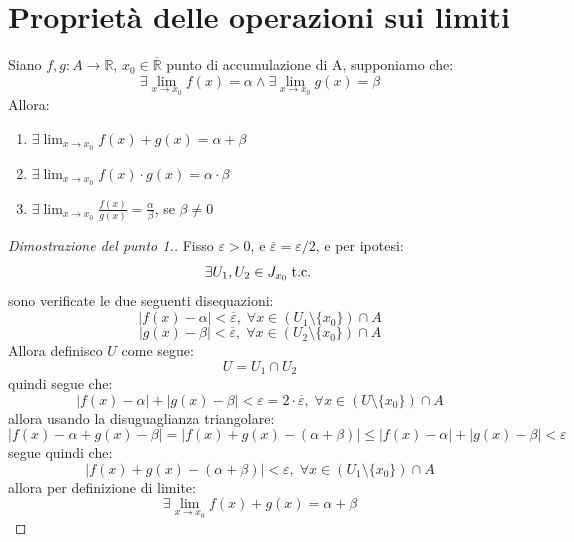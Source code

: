 \documentclass[a4paper,12pt,openright]{book}
\begin{document}
	\section{Proprietà delle operazioni sui limiti}
	Siano $f, g: A \longrightarrow \mathbb{R}$, $x_0 \in \overline{\mathbb{R}}$ punto di accumulazione di A, supponiamo che:
	\[\exists \lim_{x \rightarrow x_0} f(x) = \alpha \wedge \exists \lim_{x \rightarrow x_0} g(x) = \beta\]
	Allora:
	\begin{enumerate}
		\item $\exists \lim_{x \rightarrow x_0} f(x) + g(x) = \alpha + \beta$
		\item $\exists \lim_{x \rightarrow x_0} f(x) \cdot g(x) = \alpha \cdot \beta$
		\item $\exists \lim_{x \rightarrow x_0} \frac{f(x)}{g(x)} = \frac{\alpha}{\beta}$, se $\beta \not = 0$ 
	\end{enumerate}
	
	\begin{proof}[Dimostrazione del punto 1.]
		Fisso $\varepsilon > 0$, e $\overline{\varepsilon} = \varepsilon/2$, e per ipotesi:
		\[\exists U_1, U_2 \in J_{x_0} \;\text{t.c.}\; \]
		sono verificate le due seguenti disequazioni:
		\[|f(x) - \alpha| < \overline{\varepsilon}, \; \forall x \in (U_1 \setminus \{x_0\}) \cap A\]
		\[|g(x) - \beta| < \overline{\varepsilon}, \; \forall x \in (U_2 \setminus \{x_0\}) \cap A\]
		Allora definisco $U$ come segue:
		\[U = U_1 \cap U_2\]
		quindi segue che:
		\[|f(x) - \alpha| + |g(x) - \beta| < \varepsilon = 2 \cdot \overline{\varepsilon}, \; \forall x \in (U \setminus \{x_0\}) \cap A\]
		allora usando la disuguaglianza triangolare:
		\[|f(x) - \alpha + g(x) - \beta| = |f(x) + g(x) - (\alpha + \beta)| \leq |f(x) - \alpha| + |g(x) - \beta| < \varepsilon\]
		segue quindi che:
		\[|f(x) + g(x) - (\alpha + \beta)| < \varepsilon, \; \forall x \in (U_1 \setminus \{x_0\}) \cap A\]
		allora per definizione di limite:
		\[\exists \lim_{x \rightarrow x_0} f(x) + g(x) = \alpha + \beta\]
	\end{proof}
	
	\newpage
	
\end{document}
